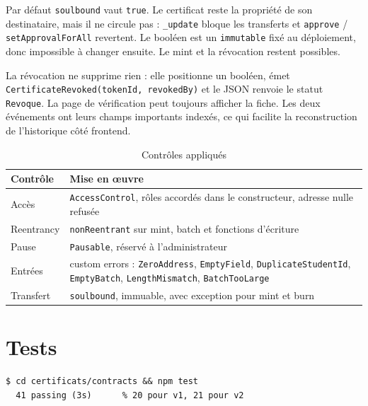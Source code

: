 \documentclass[11pt,a4paper,parskip=half]{scrartcl}
\begin{document}
Par défaut \texttt{soulbound} vaut \texttt{true}. Le certificat reste la propriété
de son destinataire, mais il ne circule pas : \texttt{\_update} bloque les
transferts et \texttt{approve} / \texttt{setApprovalForAll} revertent. Le booléen
est un \texttt{immutable} fixé au déploiement, donc impossible à changer ensuite.
Le mint et la révocation restent possibles.

La révocation ne supprime rien : elle positionne un booléen, émet
\texttt{CertificateRevoked}\allowbreak\texttt{(tokenId, revokedBy)} et le JSON renvoie le statut
\texttt{Revoque}. La page de vérification peut toujours afficher la fiche. Les
deux événements ont leurs champs importants indexés, ce qui facilite la
reconstruction de l'historique côté frontend.

\begin{table}[htbp]
\centering
\caption{Contrôles appliqués}
\small
\begin{tabularx}{\textwidth}{@{}lX@{}}
\toprule
Contrôle & Mise en œuvre \\
\midrule
Accès & \texttt{AccessControl}, rôles accordés dans le constructeur, adresse nulle refusée \\
Reentrancy & \texttt{nonReentrant} sur mint, batch et fonctions d'écriture \\
Pause & \texttt{Pausable}, réservé à l'administrateur \\
Entrées & custom errors : \texttt{ZeroAddress}, \texttt{EmptyField}, \texttt{DuplicateStudentId}, \texttt{EmptyBatch}, \texttt{LengthMismatch}, \texttt{BatchTooLarge} \\
Transfert & \texttt{soulbound}, immuable, avec exception pour mint et burn \\
\bottomrule
\end{tabularx}
\end{table}

\section{Tests}

\begin{lstlisting}[basicstyle=\ttfamily\small]
$ cd certificats/contracts && npm test
  41 passing (3s)      % 20 pour v1, 21 pour v2
\end{lstlisting}
\end{document}
